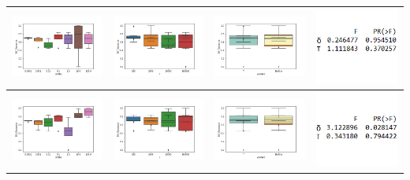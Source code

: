 \begin{table}[H]
\begin{tabular}[c]{llll}
\multicolumn{1}{|l|}{\includegraphics[align=t, width=33mm]{cajasDeltha_exp12.jpg}}    & \multicolumn{1}{l|}{\includegraphics[align=t, width=33mm]{cajasT1_exp12.jpg} } & \multicolumn{1}{l|}{\includegraphics[align=t, width=33mm]{cajasT_Deltha_exp12.jpg} } & \multicolumn{1}{p{3cm}|}{\includegraphics[align=t, width=30mm]{Anova12.png}} \\ \hline
\multicolumn{1}{|l|}{\includegraphics[align=t, width=33mm]{cajasDeltha_exp13.jpg}}    & \multicolumn{1}{l|}{\includegraphics[align=t, width=33mm]{cajasT1_exp13.jpg} } & \multicolumn{1}{l|}{\includegraphics[align=t, width=33mm]{cajasT_Deltha_exp13.jpg} } & \multicolumn{1}{p{3cm}|}{\includegraphics[align=t, width=30mm]{Anova13.png}} \\ \hline
\end{tabular}
\label{exp1}
\end{table}

